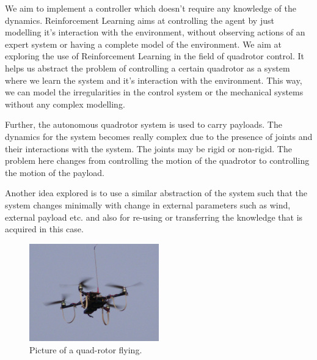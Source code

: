 \documentclass[hidelinks,BTech]{iitmdiss}
\begin{document}
We aim to implement a controller which doesn't require any knowledge of the dynamics. Reinforcement Learning aims at controlling the agent by just modelling it's interaction with the environment, without observing actions of an expert system or having a complete model of the environment. We aim at exploring the use of Reinforcement Learning in the field of quadrotor control. It helps us abstract the problem of controlling a certain quadrotor as a system where we learn the system and it's interaction with the environment. This way, we can model the irregularities in the control system or the mechanical systems without any complex modelling. 

Further, the autonomous quadrotor system is used to carry payloads. The dynamics for the system becomes really complex due to the presence of joints and their interactions with the system. The joints may be rigid or non-rigid. The problem here changes from controlling the motion of the quadrotor to controlling the motion of the payload. 

Another idea explored is to use a similar abstraction of the system such that the system changes minimally with change in external parameters such as wind, external payload etc. and also for re-using or transferring the knowledge that is acquired in this case. 

\begin{figure}[H]
  \centering
    \includegraphics[width=0.5\textwidth]{quadrotor.jpg}
    \caption{Picture of a quad-rotor flying.}
\end{figure}
\end{document}
